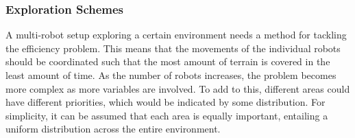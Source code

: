 \subsubsection{Exploration Schemes}
A multi-robot setup exploring a certain environment needs a method for tackling the efficiency problem. This means that the movements of the individual robots should be coordinated such that the most amount of terrain is covered in the least amount of time. As the number of robots increases, the problem becomes more complex as more variables are involved. To add to this, different areas could have different priorities, which would be indicated by some distribution. For simplicity, it can be assumed that each area is equally important, entailing a uniform distribution across the entire environment. 

